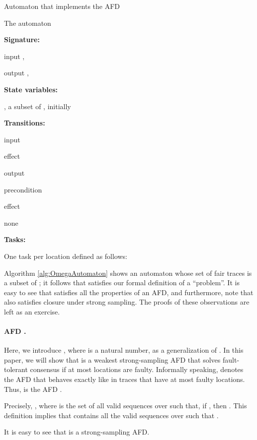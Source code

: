 \documentclass[11pt]{article}
\numberwithin{theorem}{section}
\newcommand{\tab}{\hspace{5mm}}
\begin{document}
\begin{algorithm}\footnotesize
\caption{Automaton that implements the  AFD}
\label{alg:OmegaAutomaton}
The automaton 

\textbf{Signature:}

\tab input ,  

\tab output , 


\textbf{State variables:}

\tab , a subset of , initially 

\textbf{Transitions:}

\tab input 

\tab effect

\tab \tab 

\tab

\tab output 

\tab precondition

\tab \tab 

\tab effect

\tab \tab none

\textbf{Tasks:}

\tab One task per location  defined as follows:

\tab \tab 

\end{algorithm}
 
Algorithm \ref{alg:OmegaAutomaton} shows an automaton whose set of
fair traces is a subset of ; it follows that 
satisfies our formal definition of a ``problem''.
It is easy to see that 
satisfies all the properties of an AFD, and furthermore, note that
 also satisfies closure under strong sampling. 
The proofs of these observations are left as an exercise.

\paragraph{AFD .}  Here, we introduce , where  is a natural number, as a generalization of . In this paper, we will show that  is a weakest strong-sampling AFD that solves fault-tolerant consensus if at most  locations are faulty.
Informally speaking,  denotes the AFD
that behaves exactly like  in traces that have at most 
faulty locations. Thus,   is the AFD .

Precisely, , where
 is the set of all valid sequences  over  such that, if , then .
This definition implies that  contains all the valid
sequences over   such that .

It is easy to see that  is a strong-sampling AFD.
\end{document}
